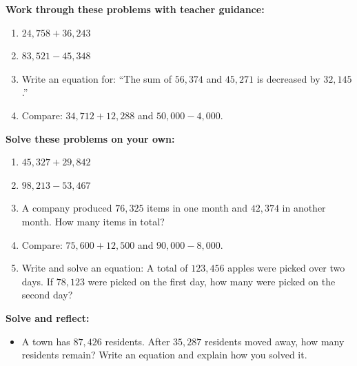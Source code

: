 \documentclass[12pt]{article}
\begin{document}
\begin{tcolorbox}[colframe=black!60, colback=white, 
coltitle=black, colbacktitle=black!15, fonttitle=\bfseries\Large, 
title=Guided Practice, halign title=center, left=10pt, right=10pt, top=10pt, bottom=15pt]
\textbf{Work through these problems with teacher guidance:}
\begin{enumerate}[itemsep=3em]
    \item \( 24,758 + 36,243 \) \vspace{1cm}
    \item \( 83,521 - 45,348 \) \vspace{1cm}
    \item Write an equation for: “The sum of \( 56,374 \) and \( 45,271 \) is decreased by \( 32,145 \).” \vspace{1cm}
    \item Compare: \( 34,712 + 12,288 \) and \( 50,000 - 4,000 \).
\end{enumerate}
\vspace{2cm}
\end{tcolorbox}

\begin{tcolorbox}[colframe=black!60, colback=white, 
coltitle=black, colbacktitle=black!15, fonttitle=\bfseries\Large, 
title=Independent Practice, halign title=center, left=10pt, right=10pt, top=10pt, bottom=15pt]
\textbf{Solve these problems on your own:}
\begin{enumerate}[itemsep=3em]
    \item \( 45,327 + 29,842 \) \vspace{1cm}
    \item \( 98,213 - 53,467 \) \vspace{1cm}
    \item A company produced \( 76,325 \) items in one month and \( 42,374 \) in another month. How many items in total? \vspace{1cm}
    \item Compare: \( 75,600 + 12,500 \) and \( 90,000 - 8,000 \). \vspace{1cm}
    \item Write and solve an equation: A total of \( 123,456 \) apples were picked over two days. If \( 78,123 \) were picked on the first day, how many were picked on the second day?
\end{enumerate}
\vspace{1cm}
\end{tcolorbox}

\begin{tcolorbox}[colframe=black!60, colback=white, 
coltitle=black, colbacktitle=black!15, fonttitle=\bfseries\Large, 
title=Exit Ticket, halign title=center, left=10pt, right=10pt, top=10pt, bottom=50pt]
\textbf{Solve and reflect:}
\begin{itemize}
    \item A town has \( 87,426 \) residents. After \( 35,287 \) residents moved away, how many residents remain? Write an equation and explain how you solved it.
\end{itemize}
\end{tcolorbox}
\end{document}
